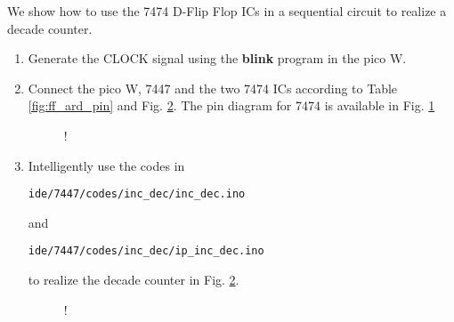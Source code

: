We show how to use the 7474 D-Flip Flop ICs in
a sequential circuit to realize a decade counter.
\iffalse
\subsection{Components}
\begin{table}[H]
\centering

\caption{}
\label{table:components-7474}
\end{table}
\fi
\begin{enumerate}[label=\arabic*.,ref=\theenumi]
\item
Generate the CLOCK signal using the \textbf{blink} program in the pico W. 
\item
Connect the pico W, 7447 and the two 7474 ICs according to Table \ref{fig:ff_ard_pin} and Fig. \ref{fig:decade_counter}. The pin diagram for 7474 is available in Fig. \ref{fig:7474}
			\begin{table}[H]
\centering

\caption{}
\label{fig:ff_ard_pin}
\end{table}
%
\begin{figure}[H]
\begin{center}
\resizebox {0.75\columnwidth} {!} {

}
\end{center}
\caption{}
\label{fig:7474}
\end{figure}

%
\item
Intelligently use the codes in 
\begin{lstlisting}
ide/7447/codes/inc_dec/inc_dec.ino
\end{lstlisting}
and
\begin{lstlisting}
ide/7447/codes/inc_dec/ip_inc_dec.ino
\end{lstlisting}
to realize the decade counter in Fig. \ref{fig:decade_counter}.
% 
 \begin{figure}[H]
\begin{center}
\resizebox {0.75\columnwidth} {!} {

}
\end{center}
\caption{}
\label{fig:decade_counter}
\end{figure}
%
	\end{enumerate}



